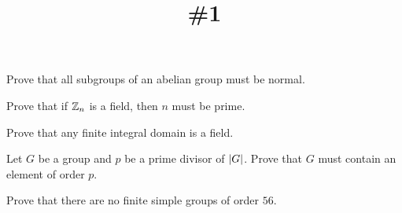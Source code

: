 \documentclass{pset}
\title{\#1}               %
\begin{document}
	\begin{problems}
		\begin{problem}[5 points]
			Prove that all subgroups of an abelian group must be normal.
		\end{problem}

		\begin{problem}[5 points]
			Prove that if $\Z_n$ is a field, then $n$ must be prime.
		\end{problem}

		\begin{problem}[10 points]
			Prove that any finite integral domain is a field.
		\end{problem}

		\begin{problem}[10 points]
			Let $G$ be a group and $p$ be a prime divisor of $\abs{G}$. Prove that $G$ must contain an element of order $p$.
		\end{problem}

		\begin{problem}[5 points]
			Prove that there are no finite simple groups of order $56$.
		\end{problem}
	\end{problems}
\end{document}
